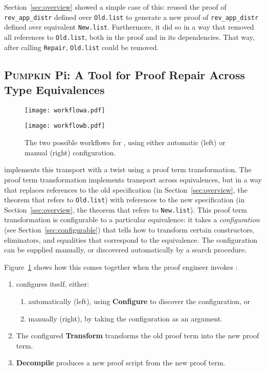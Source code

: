 Section~\ref{sec:overview} showed a simple case of this: \toolname
reused the proof of \lstinline{rev_app_distr} defined over \lstinline{Old.list}
to generate a new proof of \lstinline{rev_app_distr} defined over equivalent \lstinline{New.list}.
Furthermore, it did so in a way that removed all references to \lstinline{Old.list}, both in the proof
and in its dependencies.
That way, after calling \lstinline{Repair}, \lstinline{Old.list} could be removed.

\subsection{\textsc{Pumpkin P}i: A Tool for Proof Repair Across Type Equivalences}
\label{sec:time}

\begin{figure}
\begin{minipage}{0.52\textwidth}
\texttt{[image: workflowa.pdf]}
\end{minipage}
\hfill
\begin{minipage}{0.45\textwidth}
\texttt{[image: workflowb.pdf]}
\vspace{0.97cm}
\end{minipage}
\vspace{-0.4cm}
\caption{The two possible workflows for \toolname, using either automatic (left) or manual (right) configuration.}
\label{fig:system}
\end{figure}

\toolname implements this transport with a twist using a proof term transformation.
The proof term transformation implements transport across equivalences,
but in a way that replaces references to the old specification (in Section~\ref{sec:overview}, the theorem that refers to \lstinline{Old.list})
with references to the new specification (in Section~\ref{sec:overview}, the theorem that refers to \lstinline{New.list}).
This proof term transformation is configurable to a particular equivalence:
it takes a \textit{configuration} (see Section~\ref{sec:configurable}) 
that tells \toolname how to transform certain constructors, eliminators, and equalities that 
correspond to the equivalence.
The configuration can be supplied manually, or discovered automatically by a search procedure.

Figure~\ref{fig:system} shows how this comes together when the proof engineer invokes \toolname:

\begin{enumerate}
\item \toolname configures itself, either:
\begin{enumerate}
\item automatically (left), using \textbf{Configure} to discover the configuration, or
\item manually (right), by taking the configuration as an argument.
\end{enumerate}
\item The configured \textbf{Transform} transforms the old proof term into the new proof term.
\item \textbf{Decompile} produces a new proof script from the new proof term.
\end{enumerate}


